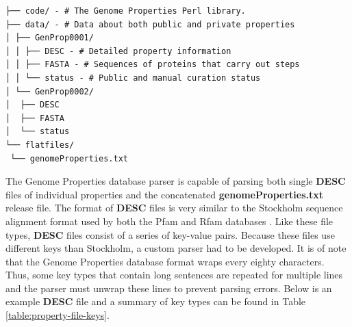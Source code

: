 \begin{verbatim}
├── code/ - # The Genome Properties Perl library.
├── data/ - # Data about both public and private properties
│ ├── GenProp0001/
│ │ ├── DESC - # Detailed property information
│ │ ├── FASTA - # Sequences of proteins that carry out steps
│ │ └── status - # Public and manual curation status
│ └── GenProp0002/
│  ├── DESC
│  ├── FASTA
│  └── status
└── flatfiles/
 └── genomeProperties.txt
\end{verbatim}

The Genome Properties database parser is capable of parsing both single \textbf{DESC} files of individual properties and the concatenated \textbf{genomeProperties.txt} release file. The format of \textbf{DESC} files is very similar to the Stockholm sequence alignment format used by both the Pfam and Rfam databases \cite{bateman2004pfam, griffiths2003rfam}. Like these file types, \textbf{DESC} files consist of a series of key-value pairs. Because these files use different keys than Stockholm, a custom parser had to be developed. It is of note that the Genome Properties database format wraps every eighty characters. Thus, some key types that contain long sentences are repeated for multiple lines and the parser must unwrap these lines to prevent parsing errors. Below is an example \textbf{DESC} file and a summary of key types can be found in Table \ref{table:property-file-keys}.

